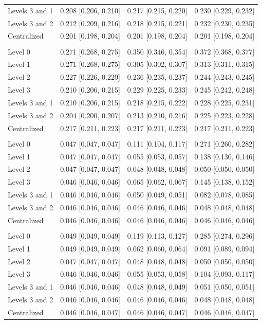 \begin{tabular}{lccc}
Levels 3 and 1 & 0.208 [0.206, 0.210] & 0.217 [0.215, 0.220] & 0.230 [0.229, 0.232] \\
Levels 3 and 2 & 0.212 [0.209, 0.216] & 0.218 [0.215, 0.221] & 0.232 [0.230, 0.235] \\
Centralized & 0.201 [0.198, 0.204] & 0.201 [0.198, 0.204] & 0.201 [0.198, 0.204] \\
\addlinespace
\multicolumn{4}{@{}l}{\textit{Diabetic, XGBoost}} \\
Level 0 & 0.271 [0.268, 0.275] & 0.350 [0.346, 0.354] & 0.372 [0.368, 0.377] \\
Level 1 & 0.271 [0.268, 0.275] & 0.305 [0.302, 0.307] & 0.313 [0.311, 0.315] \\
Level 2 & 0.227 [0.226, 0.229] & 0.236 [0.235, 0.237] & 0.244 [0.243, 0.245] \\
Level 3 & 0.210 [0.206, 0.215] & 0.229 [0.225, 0.233] & 0.245 [0.242, 0.248] \\
Levels 3 and 1 & 0.210 [0.206, 0.215] & 0.218 [0.215, 0.222] & 0.228 [0.225, 0.231] \\
Levels 3 and 2 & 0.204 [0.200, 0.207] & 0.213 [0.210, 0.216] & 0.225 [0.223, 0.228] \\
Centralized & 0.217 [0.211, 0.223] & 0.217 [0.211, 0.223] & 0.217 [0.211, 0.223] \\
\addlinespace
\multicolumn{4}{@{}l}{\textit{Heart, Random Forest}} \\
Level 0 & 0.047 [0.047, 0.047] & 0.111 [0.104, 0.117] & 0.271 [0.260, 0.282] \\
Level 1 & 0.047 [0.047, 0.047] & 0.055 [0.053, 0.057] & 0.138 [0.130, 0.146] \\
Level 2 & 0.047 [0.047, 0.047] & 0.048 [0.048, 0.048] & 0.050 [0.050, 0.050] \\
Level 3 & 0.046 [0.046, 0.046] & 0.065 [0.062, 0.067] & 0.145 [0.138, 0.152] \\
Levels 3 and 1 & 0.046 [0.046, 0.046] & 0.050 [0.049, 0.051] & 0.082 [0.078, 0.085] \\
Levels 3 and 2 & 0.046 [0.046, 0.046] & 0.046 [0.046, 0.046] & 0.048 [0.048, 0.048] \\
Centralized & 0.046 [0.046, 0.046] & 0.046 [0.046, 0.046] & 0.046 [0.046, 0.046] \\
\addlinespace
\multicolumn{4}{@{}l}{\textit{Heart, XGBoost}} \\
Level 0 & 0.049 [0.049, 0.049] & 0.119 [0.113, 0.127] & 0.285 [0.274, 0.296] \\
Level 1 & 0.049 [0.049, 0.049] & 0.062 [0.060, 0.064] & 0.091 [0.089, 0.094] \\
Level 2 & 0.047 [0.047, 0.047] & 0.048 [0.048, 0.048] & 0.050 [0.050, 0.050] \\
Level 3 & 0.046 [0.046, 0.046] & 0.055 [0.053, 0.058] & 0.104 [0.093, 0.117] \\
Levels 3 and 1 & 0.046 [0.046, 0.046] & 0.048 [0.048, 0.049] & 0.051 [0.050, 0.051] \\
Levels 3 and 2 & 0.046 [0.046, 0.046] & 0.046 [0.046, 0.046] & 0.048 [0.048, 0.048] \\
Centralized & 0.046 [0.046, 0.047] & 0.046 [0.046, 0.047] & 0.046 [0.046, 0.047] \\
\bottomrule
\end{tabular}
